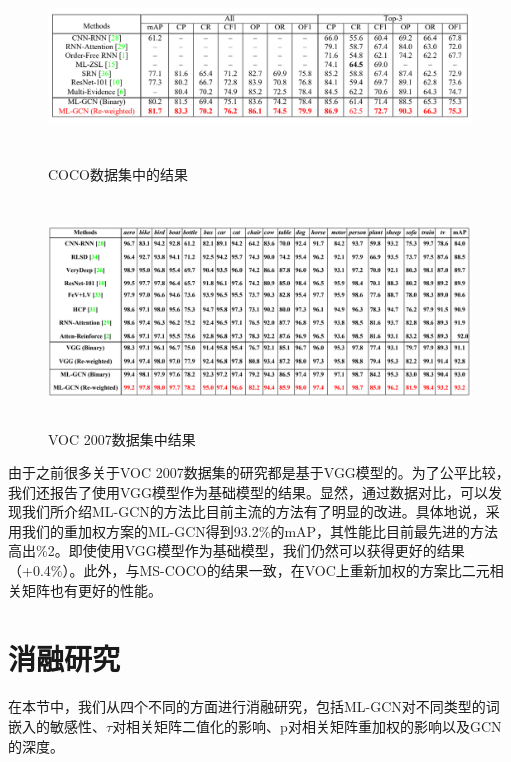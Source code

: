 \begin{figure}[htbp!]
	\centering
	\includegraphics[width=14cm, height=5cm]{figures/p4-1.png}
	\caption{COCO数据集中的结果}\label{fig:p4-1}
	\vspace{-1em}
\end{figure}

\begin{figure}[htbp!]
	\centering
	\includegraphics[width=14cm, height=6cm]{figures/p4-2.png}
	\caption{VOC 2007数据集中结果}\label{fig:p4-2}
	\vspace{-1em}
\end{figure}

由于之前很多关于VOC 2007数据集的研究都是基于VGG模型的\cite{Li2014Multi}。为了公平比较，我们还报告了使用VGG模型作为基础模型的结果。显然，通过数据对比，可以发现我们所介绍ML-GCN的方法比目前主流的方法有了明显的改进。具体地说，采用我们的重加权方案的ML-GCN得到93.2\%的mAP，其性能比目前最先进的方法高出\%2。即使使用VGG模型作为基础模型，我们仍然可以获得更好的结果（+0.4\%）。此外，与MS-COCO的结果一致，在VOC上重新加权的方案比二元相关矩阵也有更好的性能。

\section{消融研究}
在本节中，我们从四个不同的方面进行消融研究，包括ML-GCN对不同类型的词嵌入的敏感性、$\tau$对相关矩阵二值化的影响、p对相关矩阵重加权的影响以及GCN的深度。

